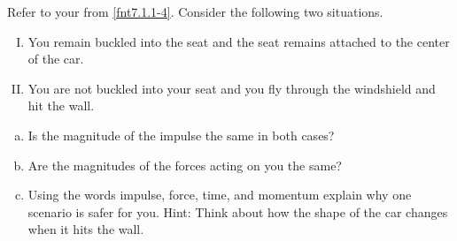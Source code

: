 \label{fnt7.1.1-6}


Refer to your \pcharts{} from \ref{fnt7.1.1-4}. Consider the following two situations.

\begin{enumerate}[I.]
	\item You remain buckled into the seat and the seat remains attached to the center of the car.
	\item You are not buckled into your seat and you fly through the windshield and hit the wall.
\end{enumerate}

\begin{enumerate}[(a)]
	\item Is the magnitude of the impulse the same in both cases?
	\item Are the magnitudes of the forces acting on you the same?
	\item Using the words impulse, force, time, and momentum explain why one scenario is safer for you.  Hint: Think about how the shape of the car changes when it hits the wall.
\end{enumerate}